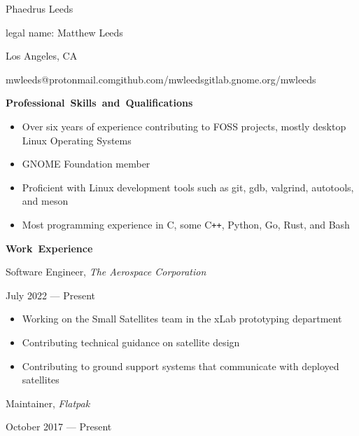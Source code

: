 \documentclass[11pt]{article}
\begin{document}
\centerline{\huge Phaedrus Leeds}
\vspace{0.4em}
\centerline{\normalsize legal name: Matthew Leeds}
\centerline{\normalsize Los Angeles, CA}
\centerline{\normalsize mwleeds@protonmail.com\space \textbar \space github.com/mwleeds\space \textbar \space gitlab.gnome.org/mwleeds}

\vspace{0.6em}
\hbox{\large \textbf{Professional Skills and Qualifications}}

\begin{itemize}
  \item Over six years of experience contributing to FOSS projects, mostly desktop Linux Operating Systems
  \item GNOME Foundation member
  \item Proficient with Linux development tools such as git, gdb, valgrind, autotools, and meson
  \item Most programming experience in C, some C\texttt{++}, Python, Go, Rust, and Bash
\end{itemize}

\vspace{0.6em}
\hbox{\large \textbf{Work Experience}}

\begin{minipage}[t]{0.65\textwidth}
\flushleft
Software Engineer, \textit{The Aerospace Corporation}\\
\end{minipage}
\begin{minipage}[t]{0.30\textwidth}
\flushright
July 2022 --- Present\\
\end{minipage}

\begin{itemize}
  \item Working on the Small Satellites team in the xLab prototyping department
  \item Contributing technical guidance on satellite design
  \item Contributing to ground support systems that communicate with deployed satellites
\end{itemize}

\begin{minipage}[t]{0.65\textwidth}
\flushleft
Maintainer, \textit{Flatpak}\\
\end{minipage}
\begin{minipage}[t]{0.30\textwidth}
\flushright
October 2017 --- Present\\
\end{minipage}
\end{document}
